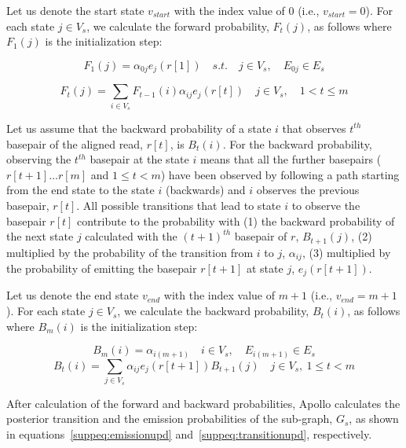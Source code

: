 \documentclass[a4paper]{article}
\begin{document}
Let us denote the start state $v_{start}$ with the index value of $0$ (i.e., $v_{start} = 0$). For each state $j \in V_{s}$, we calculate the forward probability, $F_{t}(j)$, as follows where $F_{1}(j)$ is the initialization step:

\begin{equation}
F_{1}(j) = \alpha_{0j}e_j(r[1]) \quad s.t. \quad j \in V_{s}, \quad E_{0j} \in E_s \tag{S2.1} \label{suppeq:initforward}
\end{equation}

\begin{equation}
F_{t}(j) = \sum_{i \in V_{s}} F_{t-1}(i)\alpha_{ij}e_j(r[t]) \quad j \in V_{s}, \quad 1 < t \leq m \tag{S2.2} \label{suppeq:forward}
\end{equation}

Let us assume that the backward probability of a state $i$ that observes $t^{th}$ basepair of the aligned read, $r[t]$, is $B_{t}(i)$. For the backward probability, observing the $t^{th}$ basepair at the state $i$ means that all the further basepairs ($r[t+1] \dots r[m]$ and $1 \leq t < m$) have been observed by following a path starting from the end state to the state $i$ (backwards) and $i$ observes the previous basepair, $r[t]$. All possible transitions that lead to state $i$ to observe the basepair $r[t]$ contribute to the probability with (1) the backward probability of the next state $j$ calculated with the $(t+1)^{th}$ basepair of $r$, $B_{t+1}(j)$, (2) multiplied by the probability of the transition from $i$ to $j$, $\alpha_{ij}$, (3) multiplied by the probability of emitting the basepair $r[t+1]$ at state $j$, $e_j(r[t+1])$.

Let us denote the end state $v_{end}$ with the index value of $m+1$ (i.e., $v_{end} = m+1$). For each state $j \in V_{s}$, we calculate the backward probability, $B_{t}(i)$, as follows where $B_{m}(i)$ is the initialization step:

\begin{equation}
B_{m}(i) = \alpha_{i(m+1)}\quad i \in V_{s}, \quad E_{i(m+1)} \in E_s\tag{S3.1} \label{suppeq:initbackward}
\end{equation}
\begin{equation}
B_{t}(i) = \sum_{j \in V_{s}} \alpha_{ij}e_j(r[t+1])B_{t+1}(j) \quad j \in V_{s}, ~1 \leq t < m \tag{S3.2} \label{suppeq:backward}
\end{equation}

After calculation of the forward and backward probabilities, Apollo calculates the posterior transition and the emission probabilities of the sub-graph, $G_s$, as shown in equations~\ref{suppeq:emissionupd} and~\ref{suppeq:transitionupd}, respectively. 
\end{document}
